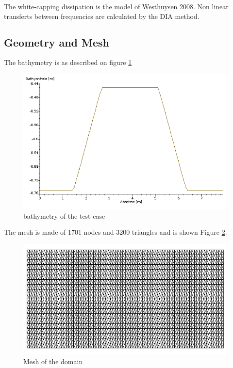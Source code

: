 The white-capping dissipation is the model of Westhuysen 2008. Non linear transferts between frequencies are calculated by the DIA method.

%
%
%
\subsection{Geometry and Mesh}
%
The bathymetry is as described on figure \ref{bathyop}
\begin{figure} [!h]
\centering
\includegraphics[scale = 0.65]{bathymetrie.png}
 \caption{bathymetry of the test case }
\label{bathyop}
\end{figure}

The mesh is made of 1701 nodes and 3200 triangles  and is shown Figure \ref{mailop}.
\begin{figure} [!h]
\centering
\includegraphics[scale = 0.65]{maillage.png}
 \caption{Mesh of the domain}
\label{mailop}
\end{figure}



